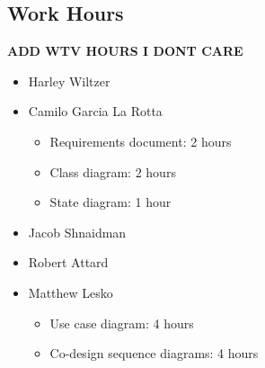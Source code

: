 \documentclass[12pt]{article}
\begin{document}
\subsection{Work Hours}
\textbf{ADD WTV HOURS I DONT CARE}
\begin{itemize}
    \item Harley Wiltzer
    \item Camilo Garcia La Rotta
    \begin{itemize}
        \item Requirements document: 2 hours
        \item Class diagram: 2 hours
        \item State diagram: 1 hour
    \end{itemize}
    \item Jacob Shnaidman
    \item Robert Attard
    \item Matthew Lesko
    \begin{itemize}
    	\item Use case diagram: 4 hours
    	\item Co-design sequence diagrams: 4 hours
    \end{itemize}
\end{itemize}
\end{document}
